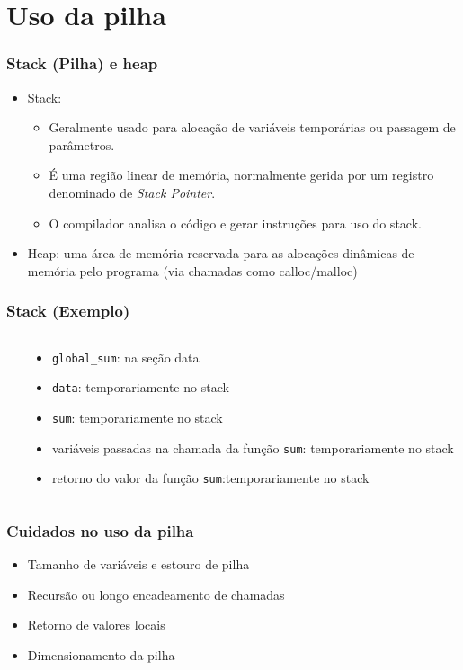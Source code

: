 \documentclass{beamer}
\begin{document}
\section{Uso da pilha}

\begin{frame}
	\frametitle{Stack (Pilha) e heap}
	\begin{itemize}
	\item Stack:
	\begin{itemize}
		\item Geralmente usado para alocação de variáveis temporárias ou passagem de parâmetros.
		\item É uma região linear de memória, normalmente gerida por um registro denominado de \textit{Stack Pointer}.
		\item O compilador analisa o código e gerar instruções para uso do stack.
	\end{itemize}
	\item Heap: uma área de memória reservada para as alocações dinâmicas de memória pelo programa (via chamadas como calloc/malloc)
	\end{itemize}
\end{frame}

\begin{frame}
	\frametitle{Stack (Exemplo)}
	\begin{columns}[T] %
	\begin{column}{.55\textwidth}
		
	\end{column}%
	\hfill%
	\begin{column}{.45\textwidth}
    {\footnotesize
	\begin{itemize}
	\item \texttt{global\_sum}: na seção data
    \item \texttt{data}: temporariamente no stack
    \item \texttt{sum}: temporariamente no stack
    \item variáveis passadas na chamada da função \texttt{sum}: temporariamente no stack
    \item retorno do valor da função \texttt{sum}:temporariamente  no stack
	\end{itemize}
    }
	\end{column}%
\end{columns}
\end{frame}

\begin{frame}
	\frametitle{Cuidados no uso da pilha}
	\begin{itemize}
	\item Tamanho de variáveis e estouro de pilha
	\item Recursão ou longo encadeamento de chamadas
	\item Retorno de valores locais
	\item Dimensionamento da pilha
	\end{itemize}
\end{frame}
\end{document}
